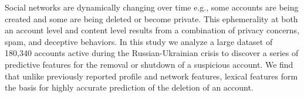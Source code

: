 Social networks are dynamically changing over time e.g., some accounts are being created and some are being deleted or become private.  This ephemerality at both an account level and content level results from a combination of privacy concerns, spam, and deceptive behaviors. In this study we analyze a large dataset of 180,340 accounts active during the Russian-Ukrainian crisis to discover a series of predictive features for the removal or shutdown of a suspicious account.  We find that unlike previously reported profile and network features, lexical features form the basis for highly accurate prediction of the deletion of an account.
